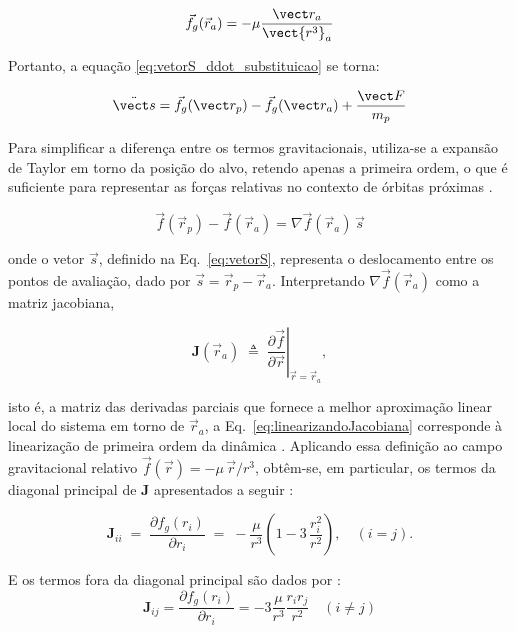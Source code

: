 \begin{equation}
    \label{eq:fg_rt}
\vec f_g(\vec r_a) = -\mu \frac{\vect r_a}{\vect {r^3}_a}
\end{equation}

Portanto, a equação \eqref{eq:vetorS_ddot_substituicao} se torna:

\begin{equation}
\label{eq:fg_rc_fg_rt}
\ddot{\vect s} = \vec f_g(\vect r_{p}) - \vec f_g(\vect r_{a}) + \frac{\vect F}{m_{p}}
\end{equation}

Para simplificar a diferença entre os termos gravitacionais, utiliza-se a expansão de Taylor em torno da posição do alvo, retendo apenas a primeira ordem, o que é suficiente para representar as forças relativas no contexto de órbitas próximas \cite{arantes2011}.

\begin{equation}
\label{eq:linearizandoJacobiana}
\vec f(\vec r_{p}) - \vec f(\vec r_{a}) = \nabla \vec f(\vec r_{a})\,\vec s
\end{equation}

onde o vetor $\vec s$, definido na Eq.~\eqref{eq:vetorS}, representa o deslocamento entre os pontos de avaliação, dado por
$\vec s = \vec r_{p} - \vec r_{a}$.
Interpretando $\nabla \vec f(\vec r_a)$ como a matriz jacobiana,

\begin{equation}
\mathbf{J}(\vec r_a) \;\triangleq\; \left.\frac{\partial \vec f}{\partial \vec r}\right|_{\vec r=\vec r_a},
\end{equation}

isto é, a matriz das derivadas parciais que fornece a melhor aproximação linear local do sistema em torno de $\vec r_a$, a Eq.~\eqref{eq:linearizandoJacobiana} corresponde à linearização de primeira ordem da dinâmica \cite{khalil2002nonlinear}. 
Aplicando essa definição ao campo gravitacional relativo $\vec f(\vec r)=-\mu\,\vec r/r^{3}$, obtêm-se, em particular, os termos da diagonal principal de $\mathbf{J}$ apresentados a seguir \cite{fehse2003}:

\begin{equation}
\label{eq:jacobianaDiagonal}
\mathbf{J}_{ii} \;=\;
\frac{\partial f_g(r_i)}{\partial r_i} \;=\;
-\frac{\mu}{r^3}\!\left(1 - 3\,\frac{r_i^2}{r^2}\right), \quad (i=j).
\end{equation}

E os termos fora da diagonal principal são dados por \cite{fehse2003}:
\begin{equation}
\label{eq:jacobianaForaDiagonal}
\mathbf{J}_{ij} =
\frac{\partial f_g(r_i)}{\partial r_i} =
-3 \frac{\mu}{r^3} \frac{r_i r_j}{r^2} \quad (i \neq j)
\end{equation}

